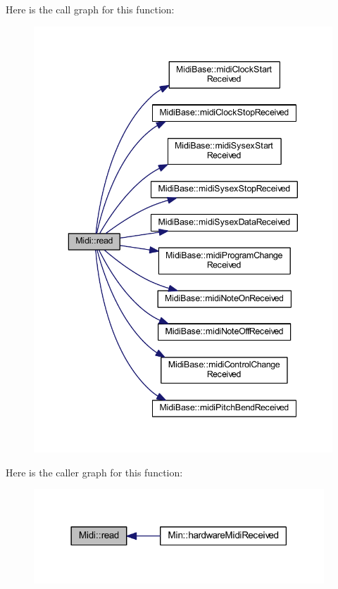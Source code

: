 Here is the call graph for this function\+:
\nopagebreak
\begin{figure}[H]
\begin{center}
\leavevmode
\includegraphics[width=343pt]{da/db9/class_midi_a6003d2a28da28e44143e494faf16acd9_cgraph}
\end{center}
\end{figure}
Here is the caller graph for this function\+:
\nopagebreak
\begin{figure}[H]
\begin{center}
\leavevmode
\includegraphics[width=309pt]{da/db9/class_midi_a6003d2a28da28e44143e494faf16acd9_icgraph}
\end{center}
\end{figure}
\mbox{\label{class_midi_a2b55e3e055e1076a4113374ec3c06056}} 
